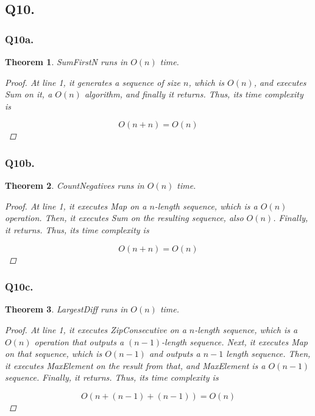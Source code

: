 \documentclass{article}
\newtheorem{theorem}{Theorem}
\theoremstyle{definition}
\begin{document}
\subsection{Q10.}

\subsubsection{Q10a.}
\begin{theorem}
    SumFirstN runs in $O(n)$ time. 
    \begin{proof}
        At line 1, it generates a sequence of size $n$, which is $O(n)$, and executes Sum on it, a $O(n)$ algorithm, and finally it returns. Thus, its time complexity is 

        $$O(n + n) = O(n)$$
    \end{proof}
\end{theorem}

\subsubsection{Q10b.}
\begin{theorem}
    CountNegatives runs in $O(n)$ time. 
    \begin{proof}
        At line 1, it executes Map on a $n$-length sequence, which is a $O(n)$ operation. Then, it executes Sum on the resulting sequence, also $O(n)$. Finally, it returns. Thus, its time complexity is 

        $$O(n + n) = O(n)$$
    \end{proof}
\end{theorem}
\subsubsection{Q10c.}
\begin{theorem}
    LargestDiff runs in $O(n)$ time. 
    \begin{proof}
        At line 1, it executes ZipConsecutive on a $n$-length sequence, which is a $O(n)$ operation that outputs a $(n - 1)$-length sequence. Next, it executes Map on that sequence, which is $O(n - 1)$ and outputs a $n - 1$ length sequence. Then, it executes MaxElement on the result from that, and MaxElement is a $O(n - 1)$ sequence. Finally, it returns. Thus, its time complexity is 

        $$O(n + (n - 1) + (n - 1)) = O(n)$$
    \end{proof}
\end{theorem}
\end{document}
